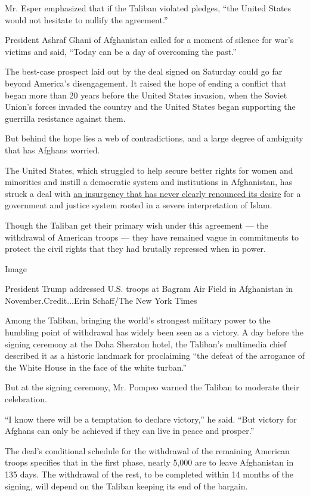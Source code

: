 Mr. Esper emphasized that if the Taliban violated pledges, ``the United
States would not hesitate to nullify the agreement.''

President Ashraf Ghani of Afghanistan called for a moment of silence for
war's victims and said, ``Today can be a day of overcoming the past.''

The best-case prospect laid out by the deal signed on Saturday could go
far beyond America's disengagement. It raised the hope of ending a
conflict that began more than 20 years before the United States
invasion, when the Soviet Union's forces invaded the country and the
United States began supporting the guerrilla resistance against them.

But behind the hope lies a web of contradictions, and a large degree of
ambiguity that has Afghans worried.

The United States, which struggled to help secure better rights for
women and minorities and instill a democratic system and institutions in
Afghanistan, has struck a deal with
\href{https://www.nytimes.com/2019/06/28/world/asia/taliban-peace-talks-constitution.html}{an
insurgency that has never clearly renounced its desire} for a government
and justice system rooted in a severe interpretation of Islam.

Though the Taliban get their primary wish under this agreement --- the
withdrawal of American troops --- they have remained vague in
commitments to protect the civil rights that they had brutally repressed
when in power.

Image

President Trump addressed U.S. troops at Bagram Air Field in Afghanistan
in November.Credit...Erin Schaff/The New York Times

Among the Taliban, bringing the world's strongest military power to the
humbling point of withdrawal has widely been seen as a victory. A day
before the signing ceremony at the Doha Sheraton hotel, the Taliban's
multimedia chief described it as a historic landmark for proclaiming
``the defeat of the arrogance of the White House in the face of the
white turban.''

But at the signing ceremony, Mr. Pompeo warned the Taliban to moderate
their celebration.

``I know there will be a temptation to declare victory,'' he said. ``But
victory for Afghans can only be achieved if they can live in peace and
prosper.''

The deal's conditional schedule for the withdrawal of the remaining
American troops specifies that in the first phase, nearly 5,000 are to
leave Afghanistan in 135 days. The withdrawal of the rest, to be
completed within 14 months of the signing, will depend on the Taliban
keeping its end of the bargain.

